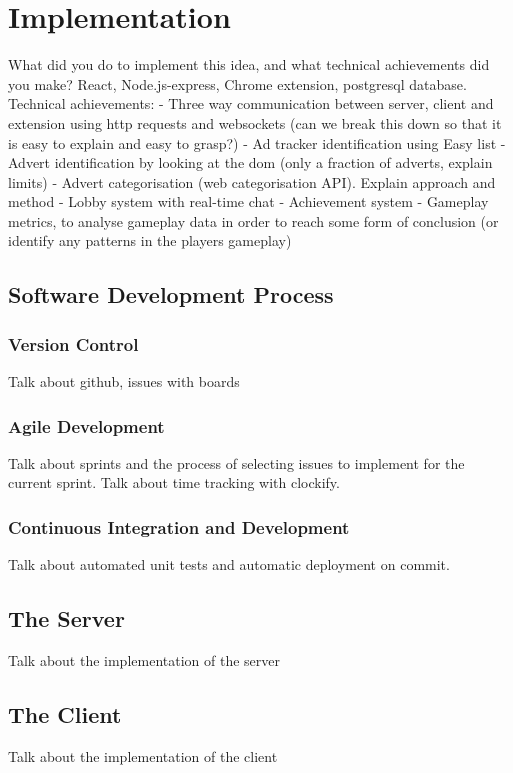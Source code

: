 \documentclass{l4proj}
\begin{document}
\chapter{Implementation}
\label{implementation}
What did you do to implement this idea, and what technical achievements did you make? 
React, Node.js-express, Chrome extension, postgresql database. 
Technical achievements:
- Three way communication between server, client and extension using http requests and websockets (can we break this down so that it is easy to explain and easy to grasp?)
- Ad tracker identification using Easy list
- Advert identification by looking at the dom (only a fraction of adverts, explain limits)
- Advert categorisation (web categorisation API). Explain approach and method
- Lobby system with real-time chat
- Achievement system
- Gameplay metrics, to analyse gameplay data in order to reach some form of conclusion (or identify any patterns in the players gameplay)


\section{Software Development Process}
\subsection{Version Control}
Talk about github, issues with boards

\subsection{Agile Development}
Talk about sprints and the process of selecting issues to implement for the current sprint. Talk about time tracking with clockify.

\subsection{Continuous Integration and Development}
Talk about automated unit tests and automatic deployment on commit.

\section{The Server}
Talk about the implementation of the server

\section{The Client}
Talk about the implementation of the client
\end{document}
